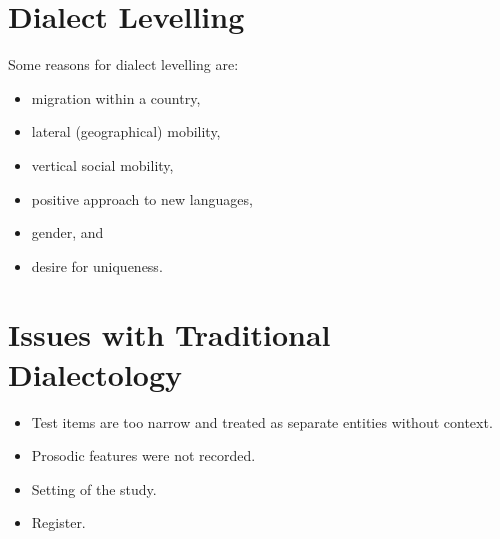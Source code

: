 \documentclass[../main.tex]{subfiles}
\begin{document}

        \section{Dialect Levelling}
        Some reasons for dialect levelling are: \begin{itemize}
            \item migration within a country,
            \item lateral (geographical) mobility,
            \item vertical social mobility,
            \item positive approach to new languages,
            \item gender, and
            \item desire for uniqueness.
        \end{itemize}

        \section{Issues with Traditional Dialectology}
        \begin{itemize}
            \item Test items are too narrow and treated as separate entities without context.
            \item Prosodic features were not recorded.
            \item Setting of the study.
            \item Register.
        \end{itemize}
        
\end{document}
